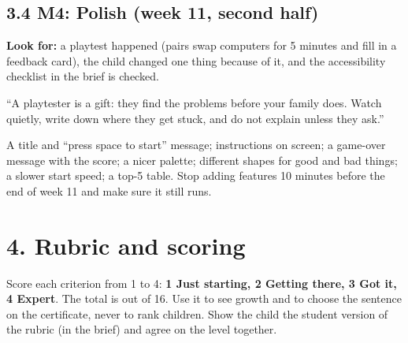 \documentclass[level=2,teacher]{kidscode}
\begin{document}
\subsection{3.4 M4: Polish (week 11, second half)}
\textbf{Look for:} a playtest happened (pairs swap computers for 5 minutes and fill in a feedback card),
the child changed one thing because of it, and the accessibility checklist in the brief is checked.

\begin{teacherscript}[Say]
\enquote{A playtester is a gift: they find the problems before your family does. Watch quietly,
write down where they get stuck, and do not explain unless they ask.}
\end{teacherscript}

\begin{tip}
A title and \enquote{press space to start} message; instructions on screen; a game-over message with the
score; a nicer palette; different shapes for good and bad things; a slower start speed; a top-5
table. Stop adding features 10 minutes before the end of week 11 and make sure it still runs.
\end{tip}

\section{4. Rubric and scoring}
Score each criterion from 1 to 4: \textbf{1 Just starting, 2 Getting there, 3 Got it, 4 Expert}.
The total is out of 16. Use it to see growth and to choose the sentence on the certificate, never to
rank children. Show the child the student version of the rubric (in the brief) and agree on the
level together.
\end{document}
